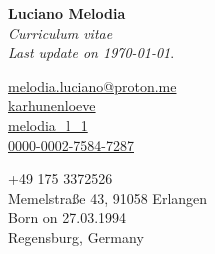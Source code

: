\documentclass[a4paper, 12pt]{article}
\begin{document}
	{\Huge \textbf{Luciano Melodia}}\\[0.1cm]
	\emph{Curriculum vitae}\\ 
	\emph{Last update on \today}.

	\begin{flushleft}
		\scriptsize
		\begin{minipage}{0.3\textwidth}
			{\footnotesize \faEnvelope} \hspace{0.1cm} \href{mailto:melodia.luciano@proton.me}{melodia.luciano@proton.me}\\[0.05cm]
			{\footnotesize \faGithub} \hspace{0.15cm} \href{https://github.com/karhunenloeve}{karhunenloeve}\\[0.05cm]
			{\footnotesize \aiarXiv} \hspace{0.1cm} \href{https://arxiv.org/a/melodia_l_1}{melodia\_l\_1}\\[0.05cm]
			{\footnotesize \aiOrcid} \hspace{0.1cm} \href{https://orcid.org/0000-0002-7584-7287}{0000-0002-7584-7287}
		\end{minipage}
		\begin{minipage}{0.4\textwidth}
			{\footnotesize \faPhone} \hspace{0.20cm} +49 175 3372526 \\[0.05cm]
			{\footnotesize \faMapPin} \hspace{0.30cm} Memelstraße 43, 91058 Erlangen\\[0.05cm]
			{\footnotesize \faMars} \hspace{0.2cm} Born on 27.03.1994\\[0.05cm]
			{\footnotesize \faMapO} \hspace{0.1cm} Regensburg, Germany
		\end{minipage}
	\end{flushleft}

\end{document}
